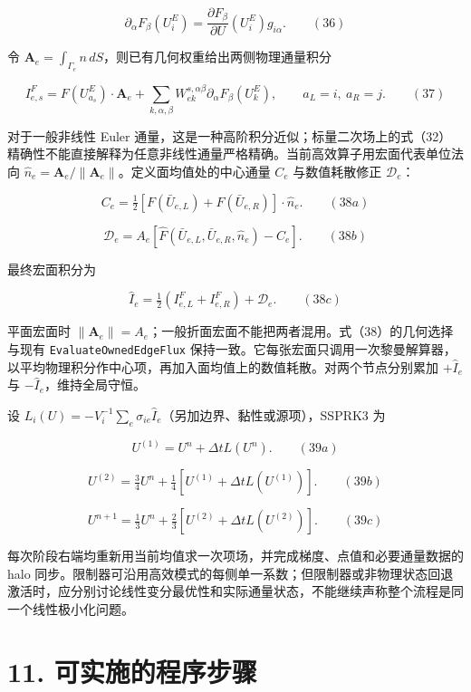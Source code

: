 \documentclass[
  11pt,
  a4paper,
]{article}
\begin{document}
\[
\partial_\alpha F_\beta(U_i^E)
=\frac{\partial F_\beta}{\partial U}(U_i^E)g_{i\alpha}. \qquad(36)
\]

令
\(\boldsymbol A_e=\int_{\Gamma_e}n\,dS\)，则已有几何权重给出两侧物理通量积分

\[
I^F_{e,s}=F(U_{a_s}^E)\cdot\boldsymbol A_e
+\sum_{k,\alpha,\beta}W_{ek}^{s,\alpha\beta}
\partial_\alpha F_\beta(U_k^E),\qquad a_L=i,\ a_R=j. \qquad(37)
\]

对于一般非线性 Euler
通量，这是一种高阶积分近似；标量二次场上的式（32）精确性不能直接解释为任意非线性通量严格精确。当前高效算子用宏面代表单位法向
\(\widehat n_e=\boldsymbol A_e/\|\boldsymbol A_e\|\)。定义面均值处的中心通量
\(C_e\) 与数值耗散修正 \(\mathcal D_e\)：

\[
C_e=\tfrac12\left[F(\bar U_{e,L})+F(\bar U_{e,R})\right]\cdot\widehat n_e. \qquad(38a)
\]

\[
\mathcal D_e=A_e\left[\widehat F(\bar U_{e,L},\bar U_{e,R},\widehat n_e)-C_e\right]. \qquad(38b)
\]

最终宏面积分为

\[
\widehat I_e=\tfrac12(I^F_{e,L}+I^F_{e,R})+\mathcal D_e. \qquad(38c)
\]

平面宏面时
\(\|\boldsymbol A_e\|=A_e\)；一般折面宏面不能把两者混用。式（38）的几何选择与现有
\texttt{EvaluateOwnedEdgeFlux}
保持一致。它每张宏面只调用一次黎曼解算器，以平均物理积分作中心项，再加入面均值上的数值耗散。对两个节点分别累加
\(+\widehat I_e\) 与 \(-\widehat I_e\)，维持全局守恒。

设
\(L_i(U)=-V_i^{-1}\sum_e\sigma_{ie}\widehat I_e\)（另加边界、黏性或源项），SSPRK3
为

\[U^{(1)}=U^n+\Delta tL(U^n).\qquad(39a)\]

\[U^{(2)}=\tfrac34U^n+\tfrac14[U^{(1)}+\Delta tL(U^{(1)})].\qquad(39b)\]

\[U^{n+1}=\tfrac13U^n+\tfrac23[U^{(2)}+\Delta tL(U^{(2)})].\qquad(39c)\]

每次阶段右端均重新用当前均值求一次项场，并完成梯度、点值和必要通量数据的
halo
同步。限制器可沿用高效模式的每侧单一系数；但限制器或非物理状态回退激活时，应分别讨论线性变分最优性和实际通量状态，不能继续声称整个流程是同一个线性极小化问题。

\hypertarget{ux53efux5b9eux65bdux7684ux7a0bux5e8fux6b65ux9aa4}{%
\section{11.
可实施的程序步骤}\label{ux53efux5b9eux65bdux7684ux7a0bux5e8fux6b65ux9aa4}}
\end{document}
